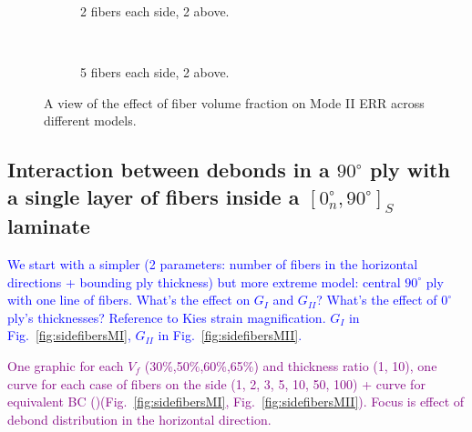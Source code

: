 \documentclass[review]{elsarticle}
\begin{document}
\begin{figure}[!h]
    \begin{subfigure}[b]{0.45\textwidth}
        \caption{2 fibers each side, 2 above.}\label{subfig:volfrac2eachside2aboveMII}
    \end{subfigure} ~
    \begin{subfigure}[b]{0.45\textwidth}
        \caption{5 fibers each side, 2 above.}\label{subfig:volfrac5eachside2aboveMII}
    \end{subfigure}

\caption{A view of the effect of fiber volume fraction on Mode II ERR across different models.}\label{fig:volumefractionMII}
\end{figure}

\subsection{Interaction between debonds in a $90^{\circ}$ ply with a single layer of fibers inside a $\left[0^{\circ}_{n}, 90^{\circ}\right]_{S}$ laminate}

\textcolor{blue}{We start with a simpler (2 parameters: number of fibers in the horizontal directions + bounding ply thickness) but more extreme model: central $90^{\circ}$ ply with one line of fibers. What's the effect on $G_{I}$ and $G_{II}$? What's the effect of $0^{\circ}$ ply's thicknesses? Reference to Kies strain magnification. $G_{I}$ in Fig.~\ref{fig:sidefibersMI}, $G_{II}$ in Fig.~\ref{fig:sidefibersMII}.}

\textcolor{purple}{One graphic for each $V_{f}$ (30\%,50\%,60\%,65\%) and thickness ratio (1, 10), one curve for each case of fibers on the side (1, 2, 3, 5, 10, 50, 100) + curve for equivalent BC ()(Fig.~\ref{fig:sidefibersMI}, Fig.~\ref{fig:sidefibersMII}). Focus is effect of debond distribution in the horizontal direction.}\\
\end{document}
